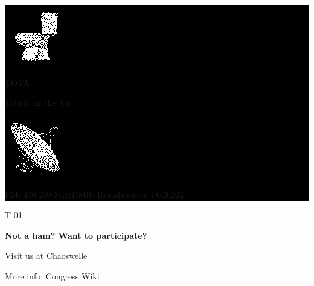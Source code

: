 \documentclass[a4paper]{article}
\begin{document}
\pagestyle{empty}
\centering

\colorbox{black}
{
\color{white}
\begin{minipage}{0.981\textwidth}
\centering

\vspace{1cm}

\begin{multicols}{3}

\includegraphics{toilet}

\columnbreak
{
{
\mbox{}
\vcrFont
\fontsize{75pt}{60pt}\selectfont
TOTA\par
}

\fontsize{20pt}{30pt}\selectfont
Toilets on the Air\par
}
\columnbreak

\includegraphics{dish}

\end{multicols}

\huge

FM: 430.200 MHz\hspace{1cm}DMR: Brandmeister TG26224\par


\vspace{0.5cm}
\end{minipage}
}

\vfill

\Huge

{
\vcrFont

\fontsize{200pt}{200pt}\selectfont
T-01\par
}
\vfill

{
\Huge

\textbf{Not a ham? Want to participate?}

Visit us at Chaoswelle

More info: Congress Wiki
}
\vfill
\end{document}
